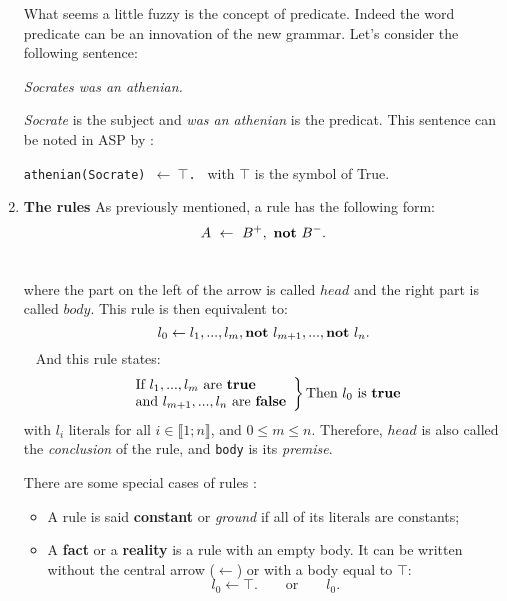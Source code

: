 \begin{enumerate}
What seems a little fuzzy is the concept of predicate. Indeed the word predicate can be an innovation of the new grammar. Let's consider the following sentence: 
\begin{tabbing}
 \textit{Socrates was an athenian.} 
\end{tabbing}
\textit{Socrate} is the subject and \textit{was an athenian} is the predicat. This sentence can be noted in ASP by :
\begin{tabbing}
 \texttt{athenian(Socrate) $\leftarrow ~ \top$. }\hspace{2cm} with \texttt{$\top$}  is the symbol of True.
\end{tabbing} 

\item \textbf{The rules}
As previously mentioned, a rule has the following form:
\texttt{
\begin{equation*} \label{eq3ASP}
 A ~ \leftarrow ~ B^+, ~ \textbf{not}~ B^-.
\end{equation*}
}

where the part on the left of the arrow is called $ head$
and the right part is called $body$.
This rule is then equivalent to:
\texttt{
\begin{equation*} \label{eq2ASP}
l_{0} \leftarrow l_{1},...,l_{m}, \textbf{not}~ l_{m+1},..., \textbf{not}~ l_{n}.
\end{equation*}
}
And this rule states:
\[
\left.
    \begin{array}{ll}
        \text{If} ~ \texttt{$l_{1},...,l_{m}$}  ~ \text{are \textbf{true}}\\
        \text{and} ~ \texttt{$l_{m+1},...,l_{n}$} ~ \text{are \textbf{false}}
    \end{array}
\right \} \text{Then} ~ \texttt{$ l_{0} $} ~ \text{is } \textbf{true} 
\]
with \texttt{$l_{i}$} literals for all $i \in \llbracket 1 ; n \rrbracket$, and $0 \leq m \leq n$.
Therefore, $head$ is also called the \emph{conclusion} of the rule,
and \texttt{body} is its \emph{premise}.

There are some special cases of rules \cite{Vladimir,baral2003knowledge}:
\begin{itemize}
\item A rule is said \textbf{constant} or \emph{ground} if all of its literals are constants;
\item A \textbf{fact} or a \textbf{reality} is a rule with an empty body.
  It can be written without the central arrow ($\leftarrow$) or with a body equal to $\top$:
  \texttt{
\begin{equation} 
l_{0} \leftarrow \top. \qquad \text{or} \qquad l_{0}.
 \label{eq5ASP}
\end{equation}
}


\end{itemize}
\end{enumerate}
